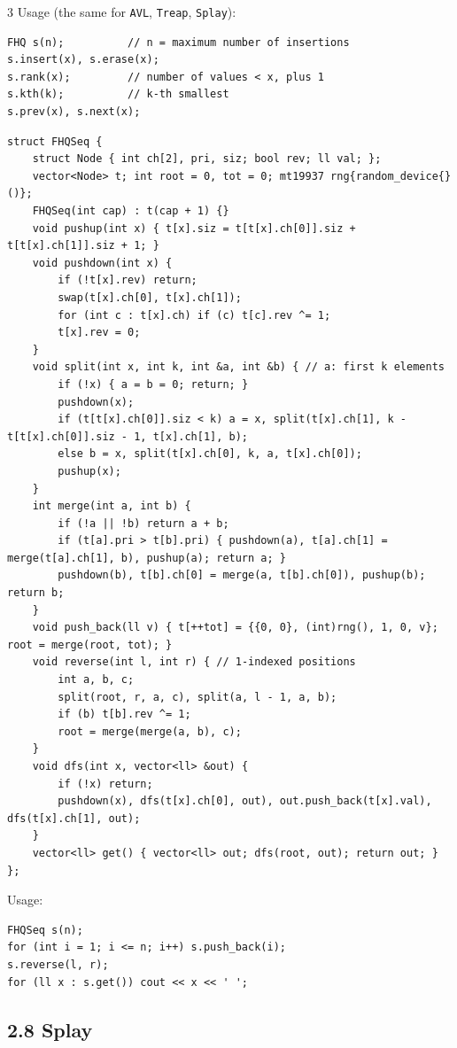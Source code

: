 \documentclass[8pt]{extarticle}
\begin{document}
\begin{multicols*}{3}
Usage (the same for \texttt{AVL}, \texttt{Treap}, \texttt{Splay}):

\begin{lstlisting}
FHQ s(n);          // n = maximum number of insertions
s.insert(x), s.erase(x);
s.rank(x);         // number of values < x, plus 1
s.kth(k);          // k-th smallest
s.prev(x), s.next(x);
\end{lstlisting}

\begin{lstlisting}
struct FHQSeq {
    struct Node { int ch[2], pri, siz; bool rev; ll val; };
    vector<Node> t; int root = 0, tot = 0; mt19937 rng{random_device{}()};
    FHQSeq(int cap) : t(cap + 1) {}
    void pushup(int x) { t[x].siz = t[t[x].ch[0]].siz + t[t[x].ch[1]].siz + 1; }
    void pushdown(int x) {
        if (!t[x].rev) return;
        swap(t[x].ch[0], t[x].ch[1]);
        for (int c : t[x].ch) if (c) t[c].rev ^= 1;
        t[x].rev = 0;
    }
    void split(int x, int k, int &a, int &b) { // a: first k elements
        if (!x) { a = b = 0; return; }
        pushdown(x);
        if (t[t[x].ch[0]].siz < k) a = x, split(t[x].ch[1], k - t[t[x].ch[0]].siz - 1, t[x].ch[1], b);
        else b = x, split(t[x].ch[0], k, a, t[x].ch[0]);
        pushup(x);
    }
    int merge(int a, int b) {
        if (!a || !b) return a + b;
        if (t[a].pri > t[b].pri) { pushdown(a), t[a].ch[1] = merge(t[a].ch[1], b), pushup(a); return a; }
        pushdown(b), t[b].ch[0] = merge(a, t[b].ch[0]), pushup(b); return b;
    }
    void push_back(ll v) { t[++tot] = {{0, 0}, (int)rng(), 1, 0, v}; root = merge(root, tot); }
    void reverse(int l, int r) { // 1-indexed positions
        int a, b, c;
        split(root, r, a, c), split(a, l - 1, a, b);
        if (b) t[b].rev ^= 1;
        root = merge(merge(a, b), c);
    }
    void dfs(int x, vector<ll> &out) {
        if (!x) return;
        pushdown(x), dfs(t[x].ch[0], out), out.push_back(t[x].val), dfs(t[x].ch[1], out);
    }
    vector<ll> get() { vector<ll> out; dfs(root, out); return out; }
};
\end{lstlisting}

Usage:

\begin{lstlisting}
FHQSeq s(n);
for (int i = 1; i <= n; i++) s.push_back(i);
s.reverse(l, r);
for (ll x : s.get()) cout << x << ' ';
\end{lstlisting}

\subsection*{2.8 Splay}


\end{multicols*}
\end{document}
